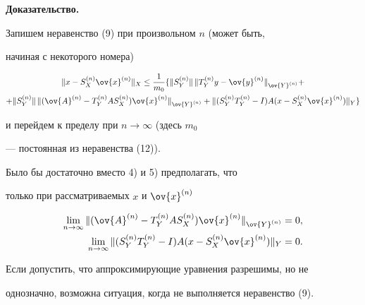 {\bf Доказательство.}


Запишем неравенство (9) при произвольном $n$ (может быть,


начиная с некоторого номера)


\begin{multline*}


\nr{x-S^{(n)}_X\ov{x}^{(n)}}_X \le \frac{1}{m_0}


\{ \nr{S^{(n)}_Y}\,\nr{T^{(n)}_Yy-\ov{y}^{(n)}}_{\ov{Y}^{(n)}} + \\


%


+\nr{S^{(n)}_Y}\,\nr{(\ov{A}^{(n)}-T^{(n)}_YAS^{(n)}_X)


\ov{x}^{(n)}}_{\ov{Y}^{(n)}} +


\nr{(S^{(n)}_YT^{(n)}_Y-I)A(x-S^{(n)}_X\ov{x}^{(n)})}_Y \}


\end{multline*}


и перейдем к пределу при $n\to\infty$ (здесь $m_0$


--- постоянная из неравенства (12)).





\begin{notenonum} Было бы достаточно вместо 4) и 5) предполагать, что


только при рассматриваемых $x$ и $\ov{x}^{(n)}$


\begin{align*}


\lim_{n\to\infty}


\nr{(\ov{A}^{(n)}-T^{(n)}_YAS^{(n)}_X)\ov{x}^{(n)}}_{\ov{Y}^{(n)}} &= 0, \\


%


\lim_{n\to\infty}


\nr{(S^{(n)}_YT^{(n)}_Y-I)A(x-S^{(n)}_X\ov{x}^{(n)})}_Y &= 0.


\end{align*}


Если допустить, что аппроксимирующие уравнения разрешимы, но не


однозначно, возможна ситуация, когда не выполняется неравенство (9).


\end{notenonum}





